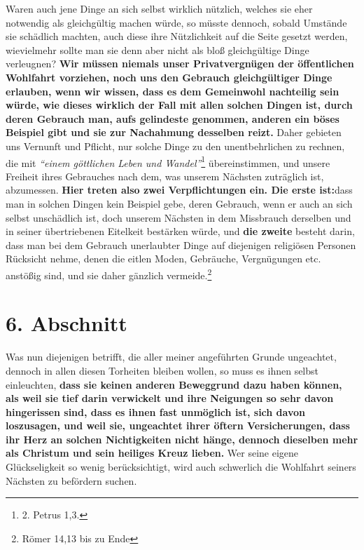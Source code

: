 Waren auch jene Dinge an sich selbst wirklich nützlich, welches sie eher
notwendig als gleichgültig machen würde, so müsste dennoch, sobald Umstände sie
schädlich machten, auch diese ihre Nützlichkeit auf die Seite gesetzt werden,
wievielmehr sollte man sie denn aber nicht als bloß gleichgültige Dinge
verleugnen? \textbf{Wir müssen niemals unser Privatvergnügen der öffentlichen
Wohlfahrt
vorziehen, noch uns den Gebrauch gleichgültiger Dinge erlauben, wenn wir wissen,
dass es dem Gemeinwohl nachteilig sein würde, wie dieses wirklich der Fall mit
allen solchen Dingen ist, durch deren Gebrauch man, aufs gelindeste genommen,
anderen ein böses Beispiel gibt und sie zur Nachahmung desselben reizt.} Daher
gebieten uns Vernunft und Pflicht, nur solche Dinge zu den unentbehrlichen zu
rechnen, die mit
\textit{"`einem göttlichen Leben und Wandel"'}\footnote{2. Petrus 1,3.}
übereinstimmen, und unsere Freiheit ihres Gebrauches nach dem, was unserem
Nächsten zuträglich ist, abzumessen. \textbf{Hier treten also zwei
Verpflichtungen ein.
Die erste ist:}dass man in solchen Dingen kein Beispiel gebe, deren Gebrauch,
wenn er auch an sich selbst unschädlich ist, doch unserem Nächsten in dem
Missbrauch derselben und in seiner übertriebenen Eitelkeit bestärken würde, und
\textbf{die zweite} besteht darin, dass man bei dem Gebrauch unerlaubter Dinge
auf
diejenigen religiösen Personen Rücksicht nehme, denen die eitlen Moden,
Gebräuche, Vergnügungen etc. anstößig sind, und sie daher gänzlich
vermeide.\footnote{Römer 14,13 bis zu Ende}

\section{6. Abschnitt} \label{kap18_ab6}

Was nun diejenigen betrifft, die aller meiner angeführten Grunde ungeachtet,
dennoch in allen diesen Torheiten bleiben wollen, so muss es ihnen selbst
einleuchten, \textbf{dass sie keinen anderen Beweggrund dazu haben können, als
weil sie
tief darin verwickelt und ihre Neigungen so sehr davon hingerissen sind, dass es
ihnen fast unmöglich ist, sich davon loszusagen, und weil sie, ungeachtet ihrer
öftern Versicherungen, dass ihr Herz an solchen Nichtigkeiten nicht hänge,
dennoch dieselben mehr als Christum und sein heiliges Kreuz
lieben.} Wer seine
eigene Glückseligkeit so wenig berücksichtigt, wird auch schwerlich die
Wohlfahrt seiners Nächsten zu befördern suchen.

